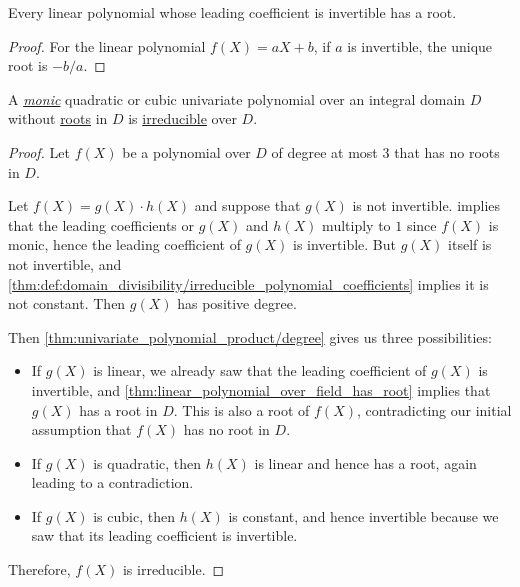 \begin{lemma}\label{thm:linear_polynomial_over_field_has_root}
  Every linear polynomial whose leading coefficient is invertible has a root.
\end{lemma}
\begin{proof}
  For the linear polynomial \( f(X) = aX + b \), if \( a \) is invertible, the unique root is \( -b/a \).
\end{proof}

\begin{proposition}\label{thm:small_degree_polynomial_without_roots_irreducible}
  A \hyperref[def:monic_polynomial]{\emph{monic}} quadratic or cubic univariate polynomial over an integral domain \( D \) without \hyperref[def:polynomial_root]{roots} in \( D \) is \hyperref[def:domain_divisibility/irreducible]{irreducible} over \( D \).
\end{proposition}
\begin{proof}
  Let \( f(X) \) be a polynomial over \( D \) of degree at most \( 3 \) that has no roots in \( D \).

  Let \( f(X) = g(X) \cdot h(X) \) and suppose that \( g(X) \) is not invertible.  implies that the leading coefficients or \( g(X) \) and \( h(X) \) multiply to \( 1 \) since \( f(X) \) is monic, hence the leading coefficient of \( g(X) \) is invertible. But \( g(X) \) itself is not invertible, and \cref{thm:def:domain_divisibility/irreducible_polynomial_coefficients} implies it is not constant. Then \( g(X) \) has positive degree.

  Then \cref{thm:univariate_polynomial_product/degree} gives us three possibilities:
  \begin{itemize}
    \item If \( g(X) \) is linear, we already saw that the leading coefficient of \( g(X) \) is invertible, and \cref{thm:linear_polynomial_over_field_has_root} implies that \( g(X) \) has a root in \( D \). This is also a root of \( f(X) \), contradicting our initial assumption that \( f(X) \) has no root in \( D \).

    \item If \( g(X) \) is quadratic, then \( h(X) \) is linear and hence has a root, again leading to a contradiction.

    \item If \( g(X) \) is cubic, then \( h(X) \) is constant, and hence invertible because we saw that its leading coefficient is invertible.
  \end{itemize}

  Therefore, \( f(X) \) is irreducible.
\end{proof}


